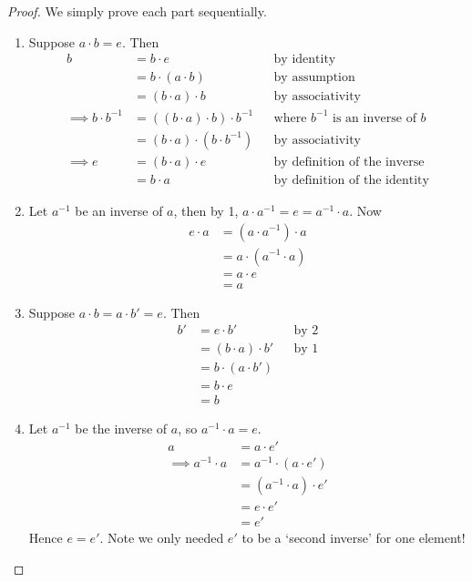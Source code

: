 \documentclass{../template/note}
\begin{document}
    \begin{proof}
        We simply prove each part sequentially.
        \begin{enumerate}
            \item Suppose \(a \cdot b = e\). Then
            \begin{align*}
                b &= b \cdot e && \text{by identity} \\
                &= b \cdot (a \cdot b) && \text{by assumption} \\
                &= (b \cdot a) \cdot b && \text{by associativity} \\
                \implies b \cdot b^{-1} &= ((b \cdot a ) \cdot b) \cdot b^{-1} && \text{where \(b^{-1}\) is an inverse of \(b\)} \\
                &= (b \cdot a) \cdot (b \cdot b^{-1}) && \text{by associativity} \\
                \implies e &= (b \cdot a) \cdot e && \text{by definition of the inverse} \\
                &= b \cdot a && \text{by definition of the identity}
            \end{align*}
            \item Let \(a^{-1}\) be an inverse of \(a\), then by 1, \(a \cdot a^{-1} = e = a^{-1} \cdot a\). Now
            \begin{align*}
                e \cdot a &= (a \cdot a^{-1}) \cdot a \\
                &= a \cdot (a^{-1} \cdot a) \\
                &= a \cdot e \\
                &= a
            \end{align*}
            \item Suppose \(a \cdot b = a \cdot b' = e\). Then
            \begin{align*}
                b' &= e \cdot b' && \text{by 2} \\
                &= (b \cdot a) \cdot b' && \text{by 1} \\
                &= b \cdot (a \cdot b') \\
                &= b \cdot e \\
                &= b
            \end{align*}
            \item Let \(a^{-1}\) be the inverse of \(a\), so \(a^{-1} \cdot a = e\).
            \begin{align*}
                a &= a \cdot e' \\
                \implies a^{-1} \cdot a &= a^{-1} \cdot (a \cdot e') \\
                &= (a^{-1} \cdot a) \cdot e' \\
                &= e \cdot e' \\
                &= e'
            \end{align*}
            Hence \(e = e'\). Note we only needed \(e'\) to be a `second inverse' for one element!
        \end{enumerate}
    \end{proof}
    
\end{document}
